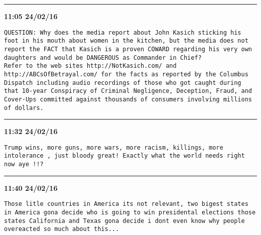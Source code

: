 \hrule%

\begin{adjustwidth}{0cm}{0cm}
\footnotesize \textbf{11:05 24/02/16}

\begin{lstlisting}[breaklines, breakatwhitespace, basicstyle=\small, frame=leftline]
QUESTION: Why does the media report about John Kasich sticking his foot in his mouth about women in the kitchen, but the media does not report the FACT that Kasich is a proven COWARD regarding his very own daughters and would be DANGEROUS as Commander in Chief?
Refer to the web sites http://NotKasich.com/ and http://ABCsOfBetrayal.com/ for the facts as reported by the Columbus Dispatch including audio recordings of those who got caught during that 10-year Conspiracy of Criminal Negligence, Deception, Fraud, and Cover-Ups committed against thousands of consumers involving millions of dollars.
\end{lstlisting}
\end{adjustwidth}

\hrule%

\begin{adjustwidth}{0cm}{0cm}
\footnotesize \textbf{11:32 24/02/16}

\begin{lstlisting}[breaklines, breakatwhitespace, basicstyle=\small, frame=leftline]
Trump wins, more guns, more wars, more racism, killings, more intolerance , just bloody great! Exactly what the world needs right now aye !!?
\end{lstlisting}
\end{adjustwidth}

\hrule%

\begin{adjustwidth}{0cm}{0cm}
\footnotesize \textbf{11:40 24/02/16}

\begin{lstlisting}[breaklines, breakatwhitespace, basicstyle=\small, frame=leftline]
Those litle countries in America its not relevant, two bigest states in America gona decide who is going to win presidental elections those states California and Texas gona decide i dont even know why people overeacted so much about this...
\end{lstlisting}
\end{adjustwidth}

